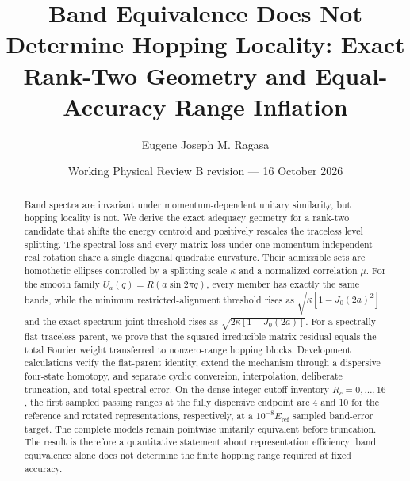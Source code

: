 \documentclass[aps,prb,reprint,amsmath,amssymb,longbibliography,floatfix]{revtex4-2}
\begin{document}
\title{Band Equivalence Does Not Determine Hopping Locality:
Exact Rank-Two Geometry and Equal-Accuracy Range Inflation}
\author{Eugene Joseph M. Ragasa}
\date{Working Physical Review B revision --- 16 October 2026}

\begin{abstract}
Band spectra are invariant under momentum-dependent unitary similarity, but hopping
locality is not. We derive the exact adequacy geometry for a rank-two candidate that
shifts the energy centroid and positively rescales the traceless level splitting. The
spectral loss and every matrix loss under one momentum-independent real rotation share a
single diagonal quadratic curvature. Their admissible sets are homothetic ellipses
controlled by a splitting scale $\kappa$ and a normalized correlation $\mu$. For the
smooth family $U_a(q)=R(a\sin2\pi q)$, every member has exactly the same bands, while the
minimum restricted-alignment threshold rises as
$\sqrt{\kappa[1-J_0(2a)^2]}$ and the exact-spectrum joint threshold rises as
$\sqrt{2\kappa[1-J_0(2a)]}$. For a spectrally flat traceless parent, we prove that the
squared irreducible matrix residual equals the total Fourier weight transferred to
nonzero-range hopping blocks. Development calculations verify the flat-parent identity,
extend the mechanism through a dispersive four-state homotopy, and separate cyclic
conversion, interpolation, deliberate truncation, and total spectral error. On the dense integer
cutoff inventory $R_c=0,\ldots,16$, the first sampled passing ranges at the fully
dispersive endpoint are 4 and 10 for the reference and rotated representations,
respectively, at a $10^{-8}E_{\mathrm{ref}}$ sampled band-error target. The complete models remain pointwise unitarily equivalent before
truncation. The result is therefore a quantitative statement about representation
efficiency: band equivalence alone does not determine the finite hopping range required
at fixed accuracy.
\end{abstract}
\maketitle
\end{document}

